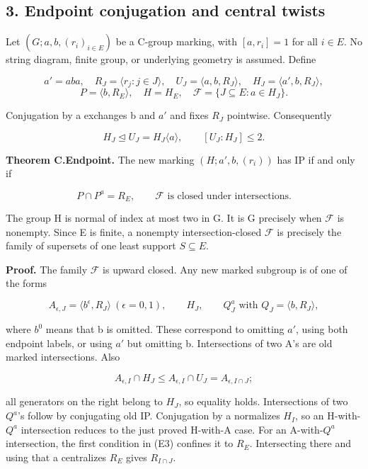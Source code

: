 \documentclass[
  11pt,
  a4paper,
]{article}
\newcounter{none} %
\begin{document}
\subsection{3. Endpoint conjugation and central
twists}\label{endpoint-conjugation-and-central-twists}

Let \((G;a,b,(r_i)_{i\in E})\) be a C-group marking, with \([a,r_i]=1\)
for all \(i\in E\). No string diagram, finite group, or underlying
geometry is assumed. Define

\[
a'=aba,\quad R_J=\langle r_j:j\in J\rangle,\quad
U_J=\langle a,b,R_J\rangle,\quad H_J=\langle a',b,R_J\rangle,
\] \[
P=\langle b,R_E\rangle,\quad H=H_E,\quad
\mathcal F=\{J\subseteq E:a\in H_J\}.
\tag{E1}
\]

Conjugation by a exchanges b and \(a'\) and fixes \(R_J\) pointwise.
Consequently

\[
H_J\trianglelefteq U_J=H_J\langle a\rangle,
\qquad [U_J:H_J]\le2.
\tag{E2}
\]

\textbf{Theorem C.Endpoint.} The new marking \((H;a',b,(r_i))\) has IP
if and only if

\[
P\cap P^a=R_E,
\qquad \mathcal F\text{ is closed under intersections}.
\tag{E3}
\]

The group H is normal of index at most two in G. It is G precisely when
\(\mathcal F\) is nonempty. Since E is finite, a nonempty
intersection-closed \(\mathcal F\) is precisely the family of supersets
of one least support \(S\subseteq E\).

\textbf{Proof.} The family \(\mathcal F\) is upward closed. Any new
marked subgroup is of one of the forms

\[
A_{\epsilon,J}=\langle b^\epsilon,R_J\rangle\ (\epsilon=0,1),
\qquad H_J,\qquad Q_J^a\text{ with }Q_J=\langle b,R_J\rangle,
\tag{E4}
\]

where \(b^{0}\) means that b is omitted. These correspond to omitting
\(a'\), using both endpoint labels, or using \(a'\) but omitting b.
Intersections of two A's are old marked intersections. Also

\[
A_{\epsilon,I}\cap H_J
\le A_{\epsilon,I}\cap U_J=A_{\epsilon,I\cap J};
\]

all generators on the right belong to \(H_J\), so equality holds.
Intersections of two \(Q^a\)'s follow by conjugating old IP. Conjugation
by a normalizes \(H_I\), so an H-with-\(Q^a\) intersection reduces to
the just proved H-with-A case. For an A-with-\(Q^a\) intersection, the
first condition in (E3) confines it to \(R_E\). Intersecting there and
using that a centralizes \(R_E\) gives \(R_{I\cap J}\).
\end{document}
